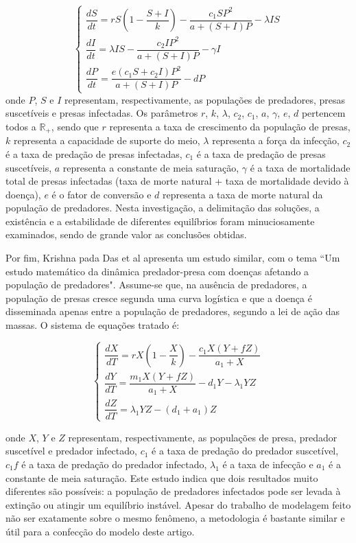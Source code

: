\documentclass{article}
\begin{document}
\begin{equation*}
    \begin{cases}
        \dfrac{dS}{dt} = rS \left( 1 - \dfrac{S + I}{k} \right) - \dfrac{c_1SP^2}{a + (S + I)P} - \lambda IS \\
        \dfrac{dI}{dt} = \lambda IS - \dfrac{c_2IP^2}{a + (S + I)P} - \gamma I \\
        \dfrac{dP}{dt} = \dfrac{e(c_1S + c_2I)P^2}{a + (S + I)P} - dP
    \end{cases}
\end{equation*}
onde $P$, $S$ e $I$ representam, respectivamente, as populações de predadores, presas suscetíveis e presas infectadas. Os parâmetros $r$, $k$, $\lambda$, $c_2$, $c_1$, $a$, $\gamma$, $e$, $d$ pertencem todos a $\mathbb{R}_+$, sendo que $r$ representa a taxa de crescimento da população de presas, $k$ representa a capacidade de suporte do meio, $\lambda$ representa a força da infecção, $c_2$ é a taxa de predação de presas infectadas, $c_1$ é a taxa de predação de presas suscetíveis, $a$ representa a constante de meia saturação, $\gamma$ é a taxa de mortalidade total de presas infectadas (taxa de morte natural + taxa de mortalidade devido à doença), $e$ é o fator de conversão e $d$ representa a taxa de morte natural da população de predadores. Nesta investigação, a delimitação das soluções, a existência e a estabilidade de diferentes equilíbrios foram minuciosamente examinados, sendo de grande valor as conclusões obtidas.

Por fim, Krishna pada Das et al  \cite{pada} apresenta um estudo similar, com o tema ``Um estudo matemático da dinâmica predador-presa com doenças afetando a população de predadores". Assume-se que, na ausência de predadores, a população de presas cresce segunda uma curva logística e que a doença é disseminada apenas entre a população de predadores, segundo a lei de ação das massas. O sistema de equações tratado é:

\begin{equation*}
    \begin{cases}
        \dfrac{dX}{dT} = rX \left( 1 - \dfrac{X}{k} \right) - \dfrac{c_1X(Y + fZ)}{a_1 + X} \\
        \dfrac{dY}{dT} = \dfrac{m_1X(Y + fZ)}{a_1 + X} - d_1Y - \lambda_1 Y Z \\
        \dfrac{dZ}{dT} = \lambda_1 Y Z - (d_1 + a_1) Z
    \end{cases}
\end{equation*}

onde $X$, $Y$ e $Z$ representam, respectivamente, as populações de presa, predador suscetível e predador infectado, $c_1$ é a taxa de predação do predador suscetível, $c_1f$ é a taxa de predação do predador infectado, $\lambda_1$ é a taxa de infecção e $a_1$ é a constante de meia saturação. Este estudo indica que dois resultados muito diferentes são possíveis: a população de predadores infectados pode ser levada à extinção ou atingir um equilíbrio instável. Apesar do trabalho de modelagem feito não ser exatamente sobre o mesmo fenômeno, a metodologia é bastante similar e útil para a confecção do modelo deste artigo.
\end{document}
